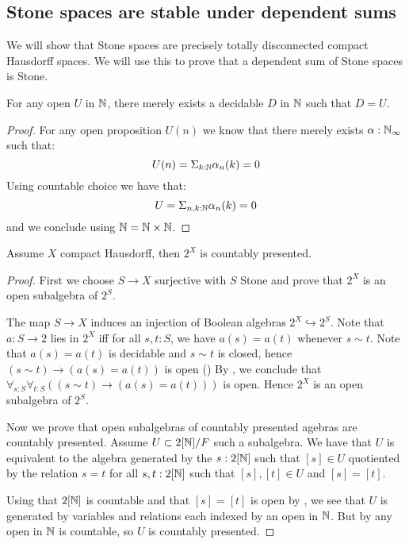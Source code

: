 \subsection{Stone spaces are stable under dependent sums}

We will show that Stone spaces are precisely totally disconnected compact Hausdorff spaces. We will use this to prove that a dependent sum of Stone spaces is Stone.

\begin{lemma}\label{OpenInNAreDecidableInN}
For any open $U$ in $\mathbb{N}$, there merely exists a decidable $D$ in $\mathbb{N}$ such that $D=U$.
\end{lemma}

\begin{proof}
For any open proposition $U(n)$ we know that there merely exists $\alpha:\mathbb{N}_\infty$ such that:
$$ U(n) = \Sigma_{k:\mathbb{N}}\alpha_n(k)=0$$
Using countable choice we have that:
$$ U = \Sigma_{n,k:\mathbb{N}}\alpha_n(k)=0$$
and we conclude using $\mathbb{N}=\mathbb{N}\times\mathbb{N}$.
\end{proof}

\begin{lemma}\label{AlgebraCompactHausdorffCountablyPresented}
Assume $X$ compact Hausdorff, then $2^X$ is countably presented.
\end{lemma}

\begin{proof}
First we choose $S\to X$ surjective with $S$ Stone and prove that $2^X$ is an open subalgebra of $2^S$.

 The map $S\to X$ induces an injection of Boolean algebras $2^X \hookrightarrow 2^S$.
  Note that $a:S\to 2$ lies in $2^X$ iff for all $s,t:S$, we have $a(s) = a(t)$ whenever $s\sim t$.
  Note that $a(s) = a(t)$ is decidable and $s\sim t$ is closed, hence 
  $(s\sim t) \to (a(s) = a(t))$ is open ()
  By , we conclude that 
  $\forall_{s:S} \forall_{t:S} ((s\sim t) \to (a(s) = a(t)))$ is open. 
  Hence $2^X$ is an open subalgebra of $2^S$. 

Now we prove that open subalgebras of countably presented agebras are countably presented. Assume $U\subset 2[\mathbb{N}] / F$ such a subalgebra. We have that $U$ is equivalent to the algebra generated by the $s:2[\mathbb{N}]$ such that $[s]\in U$ quotiented by the relation $s=t$ for all $s,t:2[\mathbb{N}]$ such that $[s],[t]\in U$ and $[s]=[t]$.

Using that $2[\mathbb{N}]$ is countable and that $[s]=[t]$ is open by , we see that $U$ is generated by variables and relations each indexed by an open in $\mathbb{N}$. But by  any open in $\mathbb{N}$ is countable, so $U$ is countably presented.
\end{proof}

